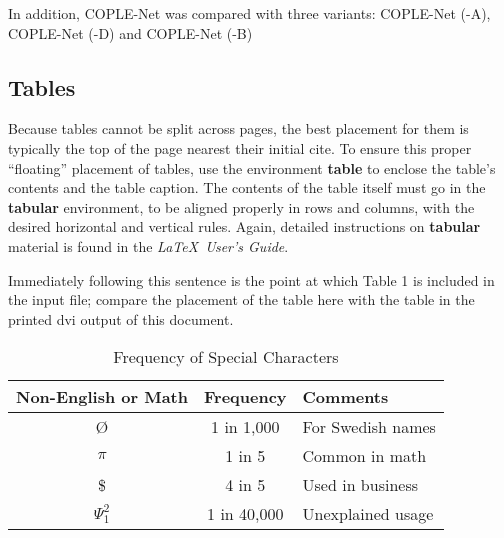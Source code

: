 \documentclass{sigkddExp}
\begin{document}
In addition, COPLE-Net was compared with three variants: COPLE-Net (-A), COPLE-Net (-D)
and COPLE-Net (-B) 

%

\subsection{Tables}
Because tables cannot be split across pages, the best
placement for them is typically the top of the page
nearest their initial cite.  To
ensure this proper ``floating'' placement of tables, use the
environment \textbf{table} to enclose the table's contents and
the table caption.  The contents of the table itself must go
in the \textbf{tabular} environment, to
be aligned properly in rows and columns, with the desired
horizontal and vertical rules.  Again, detailed instructions
on \textbf{tabular} material
is found in the \textit{\LaTeX\ User's Guide}.

Immediately following this sentence is the point at which
Table 1 is included in the input file; compare the
placement of the table here with the table in the printed
dvi output of this document.

\begin{table}
\centering
\caption{Frequency of Special Characters}
\begin{tabular}{|c|c|l|} \hline
Non-English or Math&Frequency&Comments\\ \hline
\O & 1 in 1,000& For Swedish names\\ \hline
$\pi$ & 1 in 5& Common in math\\ \hline
\$ & 4 in 5 & Used in business\\ \hline
$\Psi^2_1$ & 1 in 40,000& Unexplained usage\\
\hline\end{tabular}
\end{table}
\end{document}
